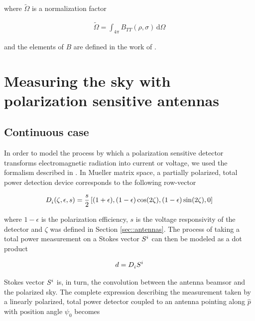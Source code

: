 \documentclass[a4paper,11pt]{article}
\begin{document}
\noindent
where $\tilde{\Omega}$ is a normalization factor

\begin{equation}
\begin{aligned}
\tilde{\Omega} = \int_{4\pi} B_{TT}(\rho,\sigma) \, \mathrm{d} \Omega
\end{aligned}
\end{equation}

\noindent
and the elements of $B$ are defined in the work of \cite{2007MNRAS.376.1767O}.

\section{Measuring the sky with polarization sensitive antennas}
\label{sec::convolution}
	
\subsection{Continuous case}

In order to model the process by which a polarization sensitive detector transforms electromagnetic radiation into current or voltage, we used the formalism described in \cite{2007A&A...470..771J}. In Mueller matrix space, a partially polarized, total power detection device corresponds to the following row-vector 

\begin{equation}
\begin{aligned}
\tensor{D}{_{i}}(\zeta,\epsilon,s) = \frac{s}{2} \left[(1 + \epsilon), (1 - \epsilon)\cos(2\zeta), (1 - \epsilon)\sin(2\zeta), 0 \right]
\end{aligned}
\label{eq::M_pol}
\end{equation}

\noindent
where $1 - \epsilon$ is the polarization efficiency, $s$ is the voltage responsivity of the detector and $\zeta$ was defined in Section \ref{sec::antennas}. The process of taking a total power measurement on a Stokes vector $\tensor{S}{^{i}}$ can then be modeled as a dot product

\begin{equation}
\begin{aligned}
d = \tensor{D}{_{i}} \tensor{S}{^{i}}
\end{aligned}
\label{eq::total_power_measurement}
\end{equation}

Stokes vector $\tensor{S}{^{i}}$ is, in turn, the convolution between the antenna beamsor and the polarized sky. The complete expression describing the measurement taken by a linearly polarized, total power detector coupled to an antenna pointing along $\hat{p}$ with position angle $\psi_0$ becomes
\end{document}
